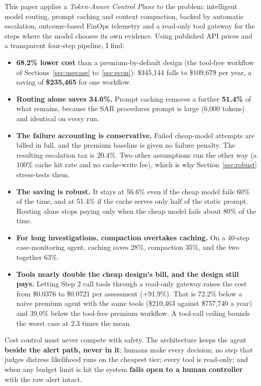 \documentclass[conference]{IEEEtran}
\begin{document}
This paper applies a \emph{Token-Aware Control Plane} to the problem: intelligent model routing, prompt caching and context compaction, backed by automatic escalation, outcome-based FinOps telemetry and a read-only tool gateway for the steps where the model chooses its own evidence. Using published API prices and a transparent four-step pipeline, I find:
\begin{itemize}
\item \textbf{68.2\% lower cost} than a premium-by-default design (the tool-free workflow of Sections~\ref{sec:usecase} to~\ref{sec:econ}): \$345,144 falls to \$109,679 per year, a saving of \textbf{\$235,465} for one workflow.
\item \textbf{Routing alone saves 34.6\%.} Prompt caching removes a further \textbf{51.4\%} of what remains, because the SAR procedures prompt is large (6,000 tokens) and identical on every run.
\item \textbf{The failure accounting is conservative.} Failed cheap-model attempts are billed in full, and the premium baseline is given no failure penalty. The resulting escalation tax is 20.4\%. Two other assumptions run the other way (a 100\% cache hit rate and no cache-write fee), which is why Section~\ref{sec:robust} stress-tests them.
\item \textbf{The saving is robust.} It stays at 56.6\% even if the cheap model fails 60\% of the time, and at 51.4\% if the cache serves only half of the static prompt. Routing alone stops paying only when the cheap model fails about 80\% of the time.
\item \textbf{For long investigations, compaction overtakes caching.} On a 40-step case-monitoring agent, caching saves 28\%, compaction 35\%, and the two together 63\%.
\item \textbf{Tools nearly double the cheap design's bill, and the design still pays.} Letting Step 2 call tools through a read-only gateway raises the cost from \$0.0376 to \$0.0721 per assessment (+91.9\%). That is 72.2\% below a naive premium agent with the same tools (\$210,463 against \$757,740 a year) and 39.0\% below the tool-free premium workflow. A tool-call ceiling bounds the worst case at 2.3 times the mean.
\end{itemize}

Cost control must never compete with safety. The architecture keeps the agent \textbf{beside the alert path, never in it}; humans make every decision; no step that judges distress likelihood runs on the cheapest tier; every tool is read-only; and when any budget limit is hit the system \textbf{fails open to a human controller} with the raw alert intact.
\end{document}
